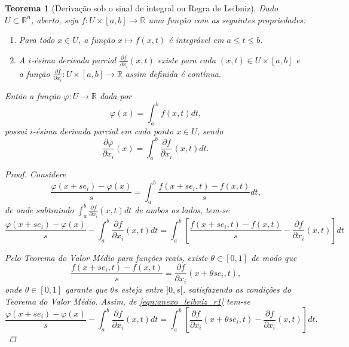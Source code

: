 \documentclass[
	12pt,				%
	openright,			%
    twoside,			%
	a4paper,			%
	english,			%
	french,				%
	spanish,			%
	brazil				%
	]{abntex2}
\newtheorem{teorema}{Teorema}
\numberwithin{lema}{chapter}
\numberwithin{teorema}{chapter}
\numberwithin{definicao}{chapter}
\numberwithin{figure}{chapter}
\begin{document}
\begin{apendicesenv}
{	\begin{teorema}[Derivação sob o sinal de integral ou Regra de Leibniz]
		\label{teorema:regra_de_leibniz}
		Dado $U\subset \mathbb{R}^n$, aberto, seja $f:U\times[a,b]\longrightarrow \mathbb{R}$ uma função com as seguintes propriedades:
		\begin{enumerate}
			\item Para todo $x \in U$, a função $x \longmapsto f(x,t)$ é integrável em $a \leqslant t \leqslant b$.
			\item A $i$-ésima derivada parcial $\frac{\partial f}{\partial x_i}(x,t)$ existe para cada $(x,t)\in U\times [a,b]$ e a função $\frac{\partial f}{\partial x_i}:U\times [a,b]\longrightarrow \mathbb{R}$ assim definida é contínua.
		\end{enumerate}
		Então a função $\varphi: U\longrightarrow \mathbb{R}$ dada por
		$$\varphi(x)=\int_a^b f(x,t)dt\text{,}$$
		possui $i$-ésima derivada parcial em cada ponto $x\in U$, sendo
		$$\frac{\partial \varphi}{\partial x_i}(x)=\int_a^b \frac{\partial f}{\partial x_i}(x,t)dt\text{.}$$

		\begin{proof}
			Considere
			$$
			\frac{\varphi(x+se_i)-\varphi(x)}{s}
			=
			\int_a^b \frac{f(x+se_i, t)-f(x,t)}{s} dt\text{,}
			$$
			de onde subtraindo $\int_a^b \frac{\partial f}{\partial x_i}(x,t) dt$ de ambos os lados, tem-se
			\begin{equation}
			\label{eqn:anexo_leibniz_r1}
			\frac{\varphi(x+se_i)-\varphi(x)}{s}
			- \int_a^b \frac{\partial f}{\partial x_i}(x,t) dt
			=
			\int_a^b \left [ 
				\frac{f(x+se_i, t)-f(x,t)}{s} 
				- \frac{\partial f}{\partial x_i}(x,t)
			\right ] dt
			\end{equation}
			
			Pelo Teorema do Valor Médio para funções reais, existe $\theta \in [0,1]$ de modo que
			$$
				\frac{f(x+se_i,t)-f(x,t)}{s}=\frac{\partial f}{\partial x_i}(x+\theta s e_i,t)\text{,}
			$$
			onde $\theta \in [0,1]$ garante que $\theta s$ esteja entre $]0, s[$, satisfazendo as condições do Teorema do Valor Médio. Assim, de \eqref{eqn:anexo_leibniz_r1} tem-se
			\begin{equation}
				\label{eqn:anexo_leibniz_voltas}
				\frac{\varphi(x+se_i)-\varphi(x)}{s}
				- \int_a^b \frac{\partial f}{\partial x_i}(x,t) dt
				=
				\int_a^b \left [
					\frac{\partial f}{\partial x_i}(x+\theta s e_i, t)-\frac{\partial f}{\partial x_i}(x,t)
				\right ] dt\text{.}
			\end{equation}
			

\end{proof}
\end{teorema}}
\end{apendicesenv}
\end{document}
